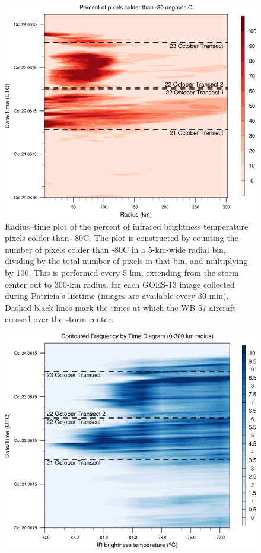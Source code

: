 \begin{figure}[ht]
\centerline{\includegraphics[width=39pc]{figures/fig08_hovmoller_tbpercent.png}}
\caption{Radius–time plot of the percent of infrared brightness temperature pixels colder than -80\textdegree{}C. The plot is constructed by counting the number of pixels colder than -80\textdegree{}C in a 5-km-wide radial bin, dividing by the total number of pixels in that bin, and multiplying by 100. This is performed every 5 km, extending from the storm center out to 300-km radius, for each GOES-13 image collected during Patricia’s lifetime (images are available every 30 min). Dashed black lines mark the times at which the WB-57 aircraft crossed over the storm center.}
\label{fig:hovmoller}
\end{figure}

\begin{figure}[ht]
\centerline{\includegraphics[width=39pc]{figures/fig09_CFTD.png}}
\caption{}
\label{fig:CFTD}
\end{figure}

